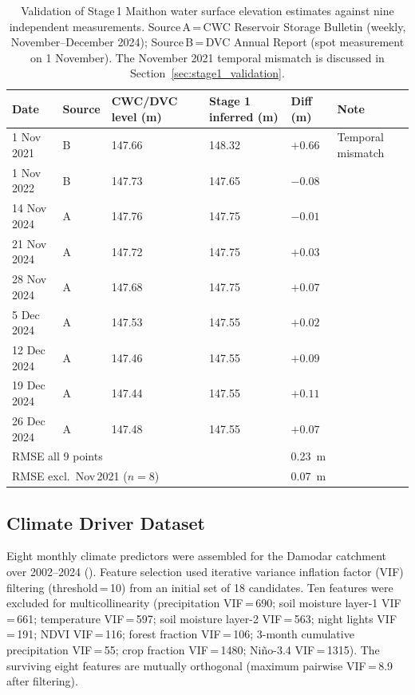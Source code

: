 \documentclass[preprint,12pt,authoryear]{elsarticle}
\begin{document}
\begin{table}[htbp]
  \centering
  \caption{Validation of Stage\,1 Maithon water surface elevation estimates
           against nine independent measurements. Source\,A\,=\,CWC Reservoir
           Storage Bulletin (weekly, November--December 2024);
           Source\,B\,=\,DVC Annual Report (spot measurement on 1 November).
           The November 2021 temporal mismatch is discussed in
           Section~\ref{sec:stage1_validation}.}
  \label{tab:validation}
  \begin{tabularx}{\linewidth}{lXXXXX}
    \toprule
    Date & Source & CWC/DVC level (m) & Stage 1 inferred (m) & Diff (m) & Note \\
    \midrule
    1 Nov 2021  & B & 147.66 & 148.32 & $+0.66$ & Temporal mismatch \\
    1 Nov 2022  & B & 147.73 & 147.65 & $-0.08$ & \\
    14 Nov 2024 & A & 147.76 & 147.75 & $-0.01$ & \\
    21 Nov 2024 & A & 147.72 & 147.75 & $+0.03$ & \\
    28 Nov 2024 & A & 147.68 & 147.75 & $+0.07$ & \\
    5 Dec 2024  & A & 147.53 & 147.55 & $+0.02$ & \\
    12 Dec 2024 & A & 147.46 & 147.55 & $+0.09$ & \\
    19 Dec 2024 & A & 147.44 & 147.55 & $+0.11$ & \\
    26 Dec 2024 & A & 147.48 & 147.55 & $+0.07$ & \\
    \midrule
    \multicolumn{4}{l}{RMSE all 9 points} & \multicolumn{2}{l}{\SI{0.23}{\metre}} \\
    \multicolumn{4}{l}{RMSE excl.\ Nov\,2021 ($n=8$)} & \multicolumn{2}{l}{\SI{0.07}{\metre}} \\
    \bottomrule
  \end{tabularx}
\end{table}

\subsection{Climate Driver Dataset}
\label{sec:methods_stage2}

Eight monthly climate predictors were assembled for the Damodar catchment
over 2002--2024 (). Feature selection used iterative
variance inflation factor (VIF) filtering (threshold\,=\,10) from an
initial set of 18 candidates. Ten features were excluded for multicollinearity
(precipitation VIF\,=\,690; soil moisture layer-1 VIF\,=\,661;
temperature VIF\,=\,597; soil moisture layer-2 VIF\,=\,563; night
lights VIF\,=\,191; NDVI VIF\,=\,116; forest fraction VIF\,=\,106;
3-month cumulative precipitation VIF\,=\,55; crop fraction VIF\,=\,1480;
Ni\~{n}o-3.4 VIF\,=\,1315). The surviving eight features are mutually
orthogonal (maximum pairwise VIF\,=\,8.9 after filtering).
\end{document}
